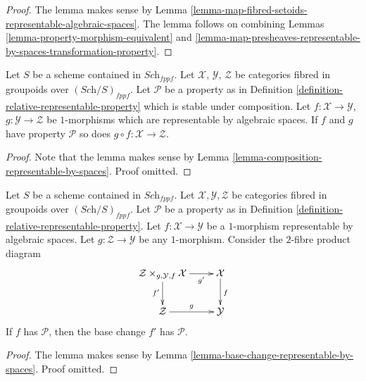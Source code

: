 \begin{proof}
The lemma makes sense by
Lemma \ref{lemma-map-fibred-setoids-representable-algebraic-spaces}.
The lemma follows on combining
Lemmas \ref{lemma-property-morphism-equivalent}
and \ref{lemma-map-presheaves-representable-by-spaces-transformation-property}.
\end{proof}

\begin{lemma}
\label{lemma-composition-representable-transformations-property}
Let $S$ be a scheme contained in $\textit{Sch}_{fppf}$.
Let $\mathcal{X}$, $\mathcal{Y}$, $\mathcal{Z}$ be categories fibred
in groupoids over $(\textit{Sch}/S)_{fppf}$.
Let $\mathcal{P}$ be a property as in
Definition \ref{definition-relative-representable-property}
which is stable under composition.
Let $f : \mathcal{X} \to \mathcal{Y}$,
$g : \mathcal{Y} \to \mathcal{Z}$ be $1$-morphisms which
are representable by algebraic spaces.
If $f$ and $g$ have property $\mathcal{P}$ so does
$g \circ f : \mathcal{X} \to \mathcal{Z}$.
\end{lemma}

\begin{proof}
Note that the lemma makes sense by
Lemma \ref{lemma-composition-representable-by-spaces}.
Proof omitted.
\end{proof}

\begin{lemma}
\label{lemma-base-change-representable-transformations-property}
Let $S$ be a scheme contained in $\textit{Sch}_{fppf}$.
Let $\mathcal{X}, \mathcal{Y}, \mathcal{Z}$
be categories fibred in groupoids over $(\textit{Sch}/S)_{fppf}$.
Let $\mathcal{P}$ be a property as in
Definition \ref{definition-relative-representable-property}.
Let $f : \mathcal{X} \to \mathcal{Y}$ be a $1$-morphism
representable by algebraic spaces.
Let $g : \mathcal{Z} \to \mathcal{Y}$ be any $1$-morphism.
Consider the $2$-fibre product diagram
$$
\xymatrix{
\mathcal{Z} \times_{g, \mathcal{Y}, f} \mathcal{X} \ar[r]_-{g'} \ar[d]_{f'} &
\mathcal{X} \ar[d]^f \\
\mathcal{Z} \ar[r]^g & \mathcal{Y}
}
$$
If $f$ has $\mathcal{P}$, then the base change $f'$
has $\mathcal{P}$.
\end{lemma}

\begin{proof}
The lemma makes sense by
Lemma \ref{lemma-base-change-representable-by-spaces}.
Proof omitted.
\end{proof}

